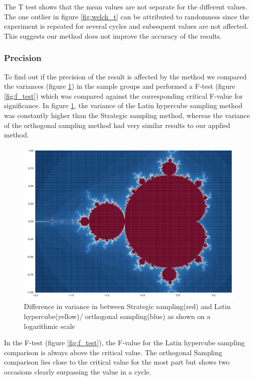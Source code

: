\documentclass{uva-inf-article}
\begin{document}
The T test shows that the mean values are not separate for the different values. The one outlier in figure \ref{fig:welch_t} can be attributed to randomness since the experiment is repeated for several cycles and subsequent values are not affected. This suggests our method does not improve the accuracy of the results.


\subsubsection{Precision}

To find out if the precision of the result is affected by the method we compared the variances  (figure \ref{fig:log_var}) in the sample groups and performed a F-test (figure \ref{fig:f_test}) which was compared against the corresponding critical F-value for significance.
In figure \ref{fig:log_var}, the variance of the Latin hypercube sampling method was constantly higher than the Strategic sampling method, whereas the variance of the orthogonal sampling method had very similar results to our applied method.\\

\begin{figure}[h!]
  \centering
 \includegraphics[width=.85\textwidth]{graphs/fractal.pdf}
  \caption{Difference in variance in between Strategic sampling(red) and Latin hypercube(yellow)/ orthogonal sampling(blue) as shown on a logarithmic scale}
  \label{fig:log_var}
\end{figure}

In the F-test (figure \ref{fig:f_test}), the F-value for the Latin hypercube sampling comparison is always above the critical value.
The orthogonal Sampling comparison lies close to the critical value for the most part but shows two occasions clearly surpassing the value in a cycle.\\
\end{document}
